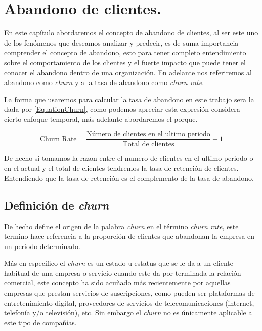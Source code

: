 
\chapter{Abandono de clientes.}

En este capítulo abordaremos el concepto de abandono de clientes, al ser este uno de los fenómenos que deseamos analizar y predecir, es de suma importancia comprender el concepto de abandono, esto para tener completo entendimiento sobre el comportamiento de los clientes y el fuerte impacto que puede tener el conocer el abandono dentro de una organización. En adelante nos referiremos al abandono como \textit{churn} y a la tasa de abandono como \textit{churn rate}.

La forma que usaremos para calcular la tasa de abandono en este trabajo sera la dada por \ref{EquationChurn}, como podemos apreciar esta expresión considera cierto enfoque temporal, más adelante abordaremos el porque.

\begin{equation}
	\textrm{Churn Rate}=\frac{\textrm{Número de clientes en el ultimo periodo}}{\textrm{Total de clientes}} -1 
	\label{EquationChurn}
\end{equation}

De hecho si tomamos la razon entre el numero de clientes en el ultimo periodo o en el actual y el total de clientes tendremos la tasa de retención de clientes. Entendiendo que la tasa de retención es el complemento de la tasa de abandono.
 
\section{Definición de \textit{churn}}

De hecho \citet[p. 36]{2020Gold} define el origen de la palabra \textit{churn} en el término \textit{churn rate}, este termino hace referencia a la proporción de clientes que abandonan la empresa en un periodo determinado. 

Más en especifico el \textit{churn} es un estado u estatus que se le da a un cliente habitual de una empresa o servicio cuando este da por terminada la relación comercial, este concepto ha sido acuñado más recientemente por aquellas empresas que prestan servicios de suscripciones, como pueden ser plataformas de entretenimiento digital, proveedores de servicios de telecomunicaciones (internet, telefonía y/o televisión), etc. Sin embargo el \textit{churn} no es únicamente aplicable a este tipo de compañías.

